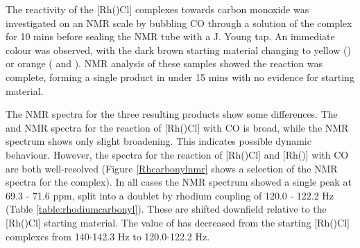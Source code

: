 The reactivity of the [Rh(\tBuxantphosk)Cl] complexes towards carbon monoxide was investigated on an NMR scale by bubbling CO through a  solution of the complex for 10 mins before sealing the NMR tube with a J. Young tap.  An immediate colour was observed, with the dark brown starting material changing to yellow (\tBusixantphos) or orange (\tButhixantphos{} and \tBuxantphos).  NMR analysis of these samples showed the reaction was complete, forming a single product in under 15 mins with no evidence for starting material.

The NMR spectra for the three resulting products show some differences.  The \proton{} and \carbon{} NMR spectra for the reaction of [Rh(\tButhixantphosk)Cl] with CO is broad, while the \phosphorus{} NMR spectrum shows only slight broadening.  This indicates possible dynamic behaviour.  However, the spectra for the reaction of [Rh(\tBusixantphosk)Cl] and [Rh(\tBuxantphosk)] with CO are both well-resolved (Figure \ref{Rhcarbonylnmr} shows a selection of the NMR spectra for the \tBuxantphos{} complex).  In all cases the \phosphorus{} NMR spectrum showed a single peak at 69.3 - 71.6 ppm, split into a doublet by rhodium coupling of 120.0 - 122.2 Hz (Table \ref{table:rhodiumcarbonyl}).  These are shifted downfield relative to the [Rh(\tBuxantphosk)Cl] starting material.  The value of \JRhP{} has decreased from the starting [Rh(\tBuxantphosk)Cl] complexes from 140-142.3 Hz to 120.0-122.2 Hz.

